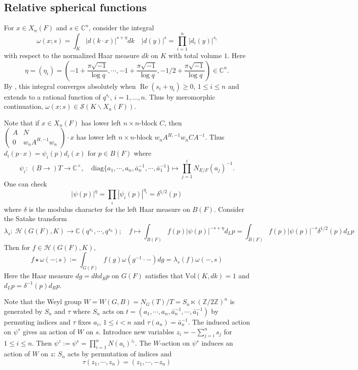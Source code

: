 \documentclass{amsart}
\theoremstyle{definition}
\theoremstyle{remark}
\newcommand{\1}{\mathbf{1}}
\newcommand{\C}{\mathbb{C}}
\newcommand{\CH}{\mathrm{CH}}
\renewcommand{\Re}{\operatorname{Re}}
\theoremstyle{definition}
\newcommand{\BC}{\mathrm{BC}}
\newcommand{\CS}{{\mathcal {S}}}
\newcommand{\BZ}{{\mathbb {Z}}}
\newcommand{\wt}{\widetilde}
\begin{document}
\subsection{Relative spherical functions}
For $x\in X_n(F)$ and $s\in\C^n$, consider the integral 
\[\omega(x;s)=\int_K|d(k\cdot x)|^{s+\eta}dk\quad |d(y)|^s=\prod_{i=1}^n|d_i(y)|^{s_i}\]
with respect to the normalized Haar measure $dk$ on $K$  with total volume $1$.  Here  \[\eta=(\eta_i)=(-1+\frac{\pi\sqrt{-1}}{\log q},\cdots,-1+\frac{\pi\sqrt{-1}}{\log q},-1/2+\frac{\pi\sqrt{-1}}{\log q})\in\C^n.\]   
By \cite[Theorem 4.1]{Off04}, this integral converges absolutely  when $\Re(s_i+\eta_i)\geq0$, $1\leq i\leq n$ and extends to a rational function of $q^{s_i}$, $i=1,...,n$. Thus by meromorphic continuation, 
$\omega(x;s)\in\CS(K\backslash X_n(F))$. 

Note that if $x\in X_n(F)$ has lower left $n\times n$-block $C$, then $\begin{pmatrix}A & N\\ 0 &  w_n A^{H,-1}w_n\end{pmatrix}\cdot x$ has lower left $n\times n$-block $ w_n A^{H,-1} w_n C A^{-1}$. Thus $d_i(p\cdot x)=\psi_i(p) d_i(x)$ for $p\in B(F)$ where \[\psi_i:\ (B\to) T\to\C^\times,\quad \mathrm{diag}\{a_1,\cdots,a_n,  \bar{a}_n^{-1},\cdots, \bar{a}_1^{-1}\}\mapsto \prod_{j=1}^iN_{E/F}(a_j)^{-1}.\] 
One can check \[|\psi(p)|^{\eta}=\prod_i|\psi_i(p)|^{\eta_i}=\delta^{1/2}(p)\]
where $\delta$  is the modulus character for the left Haar measure on $B(F)$.
Consider the Satake transform  \[\lambda_s:\ \mathcal{H}(G(F),K)\to\C(q^{s_1},\cdots, q^{s_n});\quad f\mapsto \int_{B(F)}f(p)|\psi(p)|^{-s+\eta}d_Lp=\int_{B(F)}f(p)|\psi(p)|^{-s}\delta^{1/2}(p)d_Lp\]
 Then for  $f\in\mathcal{H}(G(F),K)$,
\[f\star \omega(-;s):=\int_{G(F)}f(g)\omega(g^{-1}\cdot-)dg =\lambda_s(f)\omega(-,s)\]
Here the Haar measure $dg=dk d_Rp$ on $G(F)$ satisfies that $\mathrm{Vol}(K,dk)=1$ and $d_Lp=\delta^{-1}(p)d_R p$. 











Note that the Weyl group $W=W(G,B)=N_G(T)/T=S_n\ltimes(\BZ/2\BZ)^n$ is   generated by $S_n$ and $\tau$ where $S_n$ acts on $t=(a_1,\cdots, a_n,   \bar{a}_n^{-1},\cdots,  \bar{a}_1^{-1})$ by permuting indices and $\tau$ fixes $a_i$, $1\leq i<n$ and $\tau(a_n)= \bar{a}_n^{-1}$.  The induced action on $\psi^s$ gives an action of $W$ on $s$. Introduce new variables $z_i=-\sum_{j=i}^ns_j$ for $1\leq i\leq n$. Then $\psi^z:=\psi^s=\prod_{i=1}^nN(a_i)^{z_i}$. The $W$-action on $\psi^s$ induces an action of $W$  on $z$: $S_n$ acts by permutation of indices and \[\tau(z_1,\cdots,z_n)=(z_1,\cdots,-z_n)\] 
\end{document}
